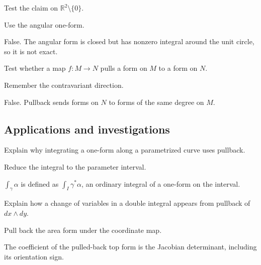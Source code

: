 \begin{exercise}\label{exr:vii09-ped-11}
Test the claim on \(\mathbb R^2\setminus\{0\}\).
\end{exercise}
\begin{hint}
Use the angular one-form.
\end{hint}
\begin{solution}
False.  The angular form is closed but has nonzero integral around the unit circle, so it is not exact.
\end{solution}

\begin{exercise}\label{exr:vii09-ped-12}
Test whether a map \(f:M\to N\) pulls a form on \(M\) to a form on \(N\).
\end{exercise}
\begin{hint}
Remember the contravariant direction.
\end{hint}
\begin{solution}
False.  Pullback sends forms on \(N\) to forms of the same degree on \(M\).
\end{solution}

\subsection*{Applications and investigations}

\begin{exercise}\label{exr:vii09-ped-13}
Explain why integrating a one-form along a parametrized curve uses pullback.
\end{exercise}
\begin{hint}
Reduce the integral to the parameter interval.
\end{hint}
\begin{solution}
\(\int_\gamma\alpha\) is defined as \(\int_I\gamma^*\alpha\), an ordinary integral of a one-form on the interval.
\end{solution}

\begin{exercise}\label{exr:vii09-ped-14}
Explain how a change of variables in a double integral appears from pullback of \(dx\wedge dy\).
\end{exercise}
\begin{hint}
Pull back the area form under the coordinate map.
\end{hint}
\begin{solution}
The coefficient of the pulled-back top form is the Jacobian determinant, including its orientation sign.
\end{solution}

